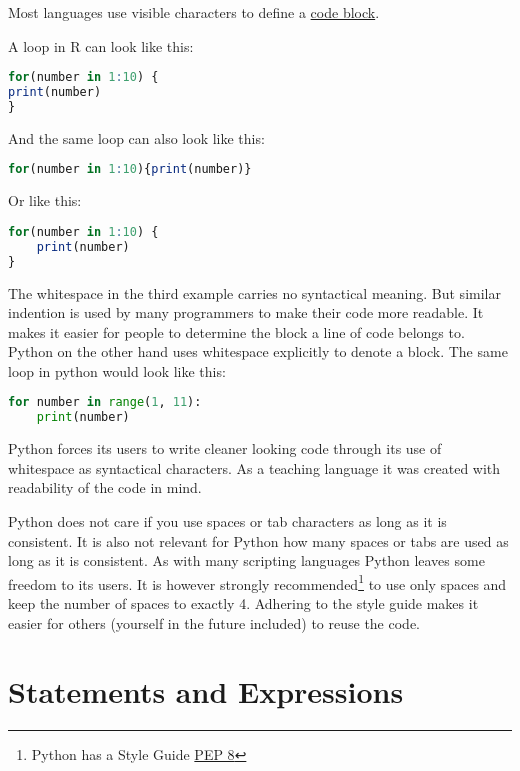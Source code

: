 \documentclass{article}
\begin{document}
Most languages use visible characters to define a
\href{https://en.wikipedia.org/wiki/Block_(programming)}{code block}.

A loop in R can look like this:

\begin{lstlisting}[language=R]
for(number in 1:10) {
print(number)
}
\end{lstlisting}

And the same loop can also look like this:

\begin{lstlisting}[language=R]
for(number in 1:10){print(number)}
\end{lstlisting}

Or like this:

\begin{lstlisting}[language=R]
for(number in 1:10) {
    print(number)
}
\end{lstlisting}


The whitespace in the third example carries no syntactical meaning.
But similar indention is used by many programmers to make their
code more readable.
It makes it easier for people to determine the block a line of code belongs to.
Python on the other hand uses whitespace explicitly to denote a block.
The same loop in python would look like this:

\begin{lstlisting}[language=Python]
for number in range(1, 11):
    print(number)
\end{lstlisting}

Python forces its users to write cleaner looking code through its use of whitespace
as syntactical characters.
As a teaching language it was created with readability of the code in mind.

Python does not care if you use spaces or tab characters as long as it is consistent.
It is also not relevant for Python how many spaces or tabs are used as long as it is consistent.
As with many scripting languages Python leaves some freedom to its users.
It is however strongly recommended\footnote{
    Python has a Style Guide
    \href{https://www.python.org/dev/peps/pep-0008/}{PEP 8}
}
to use only spaces and keep the number of spaces to exactly 4.
Adhering to the style guide makes it easier for others (yourself in the future included)
to reuse the code.


\section{Statements and Expressions}
\end{document}
